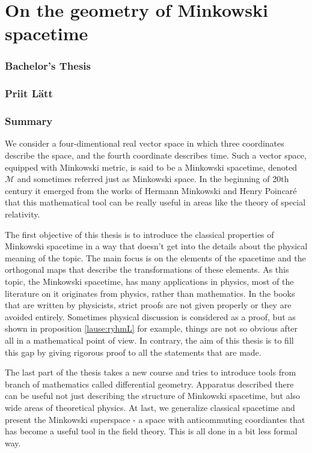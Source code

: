 \documentclass[12pt,a4paper,oneside]{article}
\theoremstyle{plain}
\theoremstyle{definition}
\numberwithin{equation}{section}
\def\M{{\mathcal M}}
\def\engtitle{On the geometry of Minkowski spacetime}
\def\author{Priit Lätt}
\begin{document}
\newpage
\section*{\engtitle}

\subsubsection*{Bachelor's Thesis}
\subsubsection*{\author}
\subsubsection*{Summary}
We consider a four-dimentional real vector space in which 
three coordinates describe the space, and the fourth coordinate 
describes time. Such a vector space, equipped with Minkowski 
metric, is said to be a Minkowski spacetime, denoted $\M$ and 
sometimes referred just as Minkowski space. In the beginning 
of 20th century it emerged from the works of Hermann Minkowski 
and Henry Poincar\'e that this mathematical tool can be 
really useful in areas like the theory of special relativity.

The first objective of this thesis is to introduce the 
classical properties of Minkowski spacetime in a way that 
doesn't get into the details about the physical meaning 
of the topic. The main focus is on the elements of the 
spacetime and the orthogonal maps that describe the 
transformations of these elements. As this topic, the 
Minkowski spacetime, has many applications in physics, 
most of the literature on it originates from physics, 
rather than mathematics. In the books that are written 
by physicists, strict proofs are not given properly or 
they are avoided entirely. Sometimes physical discussion 
is considered as a proof, but as shown in proposition 
\ref{lause:ryhmL} for example, things are not so obvious 
after all in a mathematical point of view. In contrary, 
the aim of this thesis is to fill this gap by giving rigorous 
proof to all the statements that are made.

The last part of the thesis takes a new course and tries 
to introduce tools from branch of mathematics called 
differential geometry. Apparatus described there can be 
useful not just describing the structure of Minkowski 
spacetime, but also wide areas of theoretical physics. 
At last, we generalize classical spacetime and present 
the Minkowski superspace - a space with anticommuting 
coordiantes that has become a useful tool in the 
field theory. This is all done in a bit less formal way.
\end{document}
